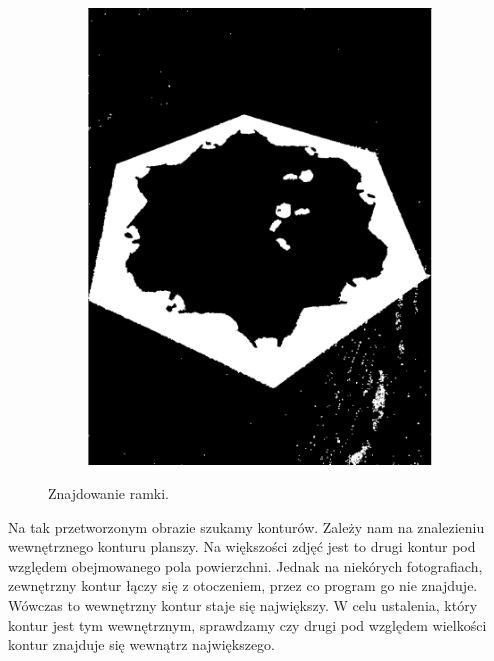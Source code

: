 \documentclass[a4paper]{article}
\begin{document}
\begin{figure}[h]
\begin{subfigure}[]{.5\linewidth}
        \end{subfigure}
        \begin{subfigure}[]{0.5\linewidth}
        \includegraphics[width=\linewidth]{pictures/steps/find_water_dilate.png}
        \end{subfigure}

        \caption{Znajdowanie ramki.}
        \label{fig:step1}
    \end{figure}

    Na tak przetworzonym obrazie szukamy konturów. Zależy nam na znalezieniu wewnętrznego konturu planszy. Na większości zdjęć jest to drugi kontur pod względem obejmowanego pola powierzchni. Jednak na niekórych fotografiach, zewnętrzny kontur łączy się z otoczeniem, przez co program go nie znajduje. Wówczas to wewnętrzny kontur staje się największy. W celu ustalenia, który kontur jest tym wewnętrznym, sprawdzamy czy drugi pod względem wielkości kontur znajduje się wewnątrz największego.
\end{document}
